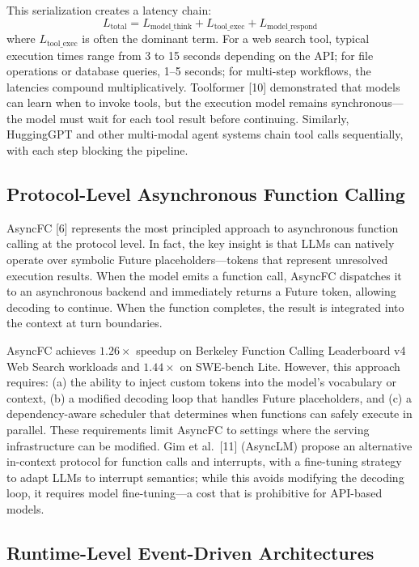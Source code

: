\documentclass[numbered,mediumone,traditional]{oup-authoring-template}
\begin{document}
This serialization creates a latency chain:
\[ L_{\mathrm{total}} = L_{\mathrm{model\_think}} + L_{\mathrm{tool\_exec}} + L_{\mathrm{model\_respond}} \]
where $L_{\mathrm{tool\_exec}}$ is often the dominant term. For a web search tool, typical execution times range from 3 to 15 seconds depending on the API; for file operations or database queries, 1--5 seconds; for multi-step workflows, the latencies compound multiplicatively. Toolformer [10] demonstrated that models can learn when to invoke tools, but the execution model remains synchronous---the model must wait for each tool result before continuing. Similarly, HuggingGPT and other multi-modal agent systems chain tool calls sequentially, with each step blocking the pipeline.

\subsection{Protocol-Level Asynchronous Function Calling}

AsyncFC [6] represents the most principled approach to asynchronous function calling at the protocol level. In fact, the key insight is that LLMs can natively operate over symbolic Future placeholders---tokens that represent unresolved execution results. When the model emits a function call, AsyncFC dispatches it to an asynchronous backend and immediately returns a Future token, allowing decoding to continue. When the function completes, the result is integrated into the context at turn boundaries.

AsyncFC achieves $1.26\times$ speedup on Berkeley Function Calling Leaderboard v4 Web Search workloads and $1.44\times$ on SWE-bench Lite. However, this approach requires: (a) the ability to inject custom tokens into the model's vocabulary or context, (b) a modified decoding loop that handles Future placeholders, and (c) a dependency-aware scheduler that determines when functions can safely execute in parallel. These requirements limit AsyncFC to settings where the serving infrastructure can be modified. Gim et al.\ [11] (AsyncLM) propose an alternative in-context protocol for function calls and interrupts, with a fine-tuning strategy to adapt LLMs to interrupt semantics; while this avoids modifying the decoding loop, it requires model fine-tuning---a cost that is prohibitive for API-based models.

\subsection{Runtime-Level Event-Driven Architectures}
\end{document}
